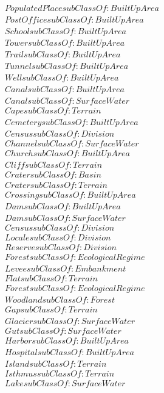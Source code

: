 \begin{align}
  PopulatedPlace subClassOf: BuiltUpArea\\
  PostOffice subClassOf: BuiltUpArea\\
  School subClassOf: BuiltUpArea\\
  Tower subClassOf: BuiltUpArea\\
  Trail subClassOf: BuiltUpArea\\
  Tunnel subClassOf: BuiltUpArea\\
  Well subClassOf: BuiltUpArea\\
  Canal subClassOf: BuiltUpArea\\
  Canal subClassOf: SurfaceWater\\
  Cape subClassOf: Terrain\\
  Cemetery subClassOf: BuiltUpArea\\
  Census subClassOf: Division\\
  Channel subClassOf: SurfaceWater\\
  Church subClassOf: BuiltUpArea\\
  Cliff subClassOf: Terrain\\
  Crater subClassOf: Basin\\
  Crater subClassOf: Terrain\\
  Crossing subClassOf: BuiltUpArea\\
  Dam subClassOf: BuiltUpArea\\
  Dam subClassOf: SurfaceWater\\
  Census subClassOf: Division\\
  Locale subClassOf: Division\\
  Reserve subClassOf: Division\\
  Forest subClassOf: EcologicalRegime\\
  Levee subClassOf: Embankment\\
  Flat subClassOf: Terrain\\
  Forest subClassOf: EcologicalRegime\\
  Woodland subClassOf: Forest\\
  Gap subClassOf: Terrain\\
  Glacier subClassOf: SurfaceWater\\
  Gut subClassOf: SurfaceWater\\
  Harbor subClassOf: BuiltUpArea\\
  Hospital subClassOf: BuiltUpArea\\
  Island subClassOf: Terrain\\
  Isthmus subClassOf: Terrain\\
  Lake subClassOf: SurfaceWater\\

\end{align}
